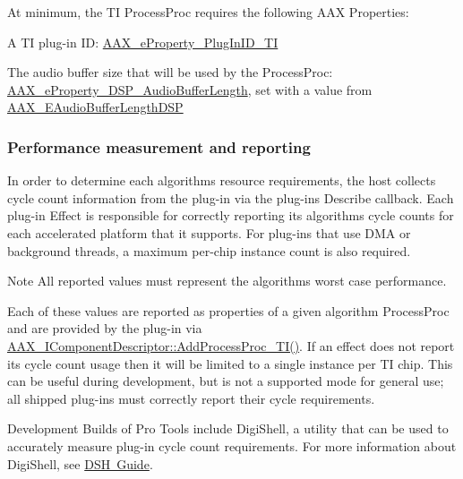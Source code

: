 At minimum, the TI Process\+Proc requires the following A\+AX Properties\+: 
\begin{DoxyItemize}
\item A TI plug-\/in ID\+: \mbox{\hyperlink{a00662_a13e384f22825afd3db6d68395b79ce0da75f174df4efbeca86eaada126c1d9214}{A\+A\+X\+\_\+e\+Property\+\_\+\+Plug\+In\+I\+D\+\_\+\+TI}}  
\item The audio buffer size that will be used by the Process\+Proc\+: \mbox{\hyperlink{a00662_a13e384f22825afd3db6d68395b79ce0da09fbd1cbcae0e86ad81005258dc1b67e}{A\+A\+X\+\_\+e\+Property\+\_\+\+D\+S\+P\+\_\+\+Audio\+Buffer\+Length}}, set with a value from \mbox{\hyperlink{a00491_ab33e0f1ecf04ca4161fa8d8de5845d67}{A\+A\+X\+\_\+\+E\+Audio\+Buffer\+Length\+D\+SP}}  
\end{DoxyItemize}

\hypertarget{a00832_subsection__performance_measurement_and_reporting}{}\subsubsection{Performance measurement and reporting}\label{a00832_subsection__performance_measurement_and_reporting}
In order to determine each algorithm\textquotesingle{}s resource requirements, the host collects cycle count information from the plug-\/in via the plug-\/in\textquotesingle{}s Describe callback. Each plug-\/in Effect is responsible for correctly reporting its algorithms\textquotesingle{} cycle counts for each accelerated platform that it supports. For plug-\/ins that use D\+MA or background threads, a maximum per-\/chip instance count is also required.

\begin{DoxyNote}{Note}
All reported values must represent the algorithm\textquotesingle{}s worst case performance.
\end{DoxyNote}
Each of these values are reported as properties of a given algorithm Process\+Proc and are provided by the plug-\/in via \mbox{\hyperlink{a01781_a38f7fb30a378a17ce9635f5c36100a3b}{A\+A\+X\+\_\+\+I\+Component\+Descriptor\+::\+Add\+Process\+Proc\+\_\+\+T\+I()}}. If an effect does not report its cycle count usage then it will be limited to a single instance per TI chip. This can be useful during development, but is not a supported mode for general use; all shipped plug-\/ins must correctly report their cycle requirements.

Development Builds of Pro Tools include Digi\+Shell, a utility that can be used to accurately measure plug-\/in cycle count requirements. For more information about Digi\+Shell, see \mbox{\hyperlink{a00835}{D\+SH Guide}}.

